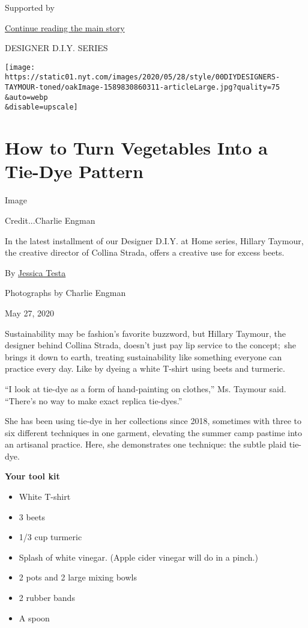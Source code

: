 Supported by

\protect\hyperlink{after-sponsor}{Continue reading the main story}

DESIGNER D.I.Y. SERIES

\texttt{[image: https://static01.nyt.com/images/2020/05/28/style/00DIYDESIGNERS-TAYMOUR-toned/oakImage-1589830860311-articleLarge.jpg?quality=75\\\&auto=webp\\\&disable=upscale]}

\hypertarget{how-to-turn-vegetables-into-a-tie-dye-pattern}{%
\section{How to Turn Vegetables Into a Tie-Dye
Pattern}\label{how-to-turn-vegetables-into-a-tie-dye-pattern}}

Image

Credit...Charlie Engman

In the latest installment of our Designer D.I.Y. at Home series, Hillary
Taymour, the creative director of Collina Strada, offers a creative use
for excess beets.

By \href{https://www.nytimes.com/by/jessica-testa}{Jessica Testa}

Photographs by Charlie Engman

May 27, 2020

Sustainability may be fashion's favorite buzzword, but Hillary Taymour,
the designer behind Collina Strada, doesn't just pay lip service to the
concept;~she brings it down to earth, treating sustainability like
something everyone can practice every day. Like by dyeing a white
T-shirt using beets and turmeric.

``I look at tie-dye as a form of hand-painting on clothes,'' Ms. Taymour
said. ``There's no way to make exact replica tie-dyes.''

She has been using tie-dye in her collections since 2018, sometimes with
three to six different techniques in one garment, elevating the summer
camp pastime into an artisanal practice. Here, she demonstrates one
technique: the subtle plaid tie-dye.

\textbf{Your tool kit}

\begin{itemize}
\item
  White T-shirt
\item
  3 beets
\item
  1/3 cup turmeric
\item
  Splash of white vinegar. (Apple cider vinegar will do in a pinch.)
\item
  2 pots and 2 large mixing bowls
\item
  2 rubber bands
\item
  A spoon
\end{itemize}

